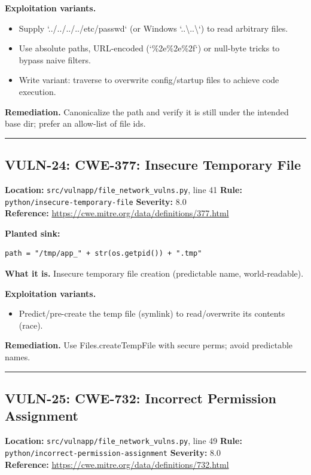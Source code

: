 \documentclass[11pt,a4paper]{article}
\begin{document}
\noindent\textbf{Exploitation variants.}
\begin{itemize}[leftmargin=1.4em,itemsep=1pt,topsep=2pt]
\item Supply `../../../../etc/passwd` (or Windows `..\textbackslash{}..\textbackslash{}`) to read arbitrary files.
\item Use absolute paths, URL-encoded (`\%2e\%2e\%2f`) or null-byte tricks to bypass naive filters.
\item Write variant: traverse to overwrite config/startup files to achieve code execution.
\end{itemize}
\noindent\textbf{Remediation.} Canonicalize the path and verify it is still under the intended base dir; prefer an allow-list of file ids.

\vspace{4pt}\hrule\vspace{6pt}
\subsection{VULN-24: CWE-377: Insecure Temporary File}
\noindent\textbf{Location:} \texttt{src/vulnapp/file\_network\_vulns.py}, line 41 \quad \textbf{Rule:} \texttt{python/insecure-temporary-file} \quad \textbf{Severity:} 8.0
\\ \textbf{Reference:} \url{https://cwe.mitre.org/data/definitions/377.html}

\noindent\textbf{Planted sink:}
\begin{lstlisting}
path = "/tmp/app_" + str(os.getpid()) + ".tmp"
\end{lstlisting}
\noindent\textbf{What it is.} Insecure temporary file creation (predictable name, world-readable).

\noindent\textbf{Exploitation variants.}
\begin{itemize}[leftmargin=1.4em,itemsep=1pt,topsep=2pt]
\item Predict/pre-create the temp file (symlink) to read/overwrite its contents (race).
\end{itemize}
\noindent\textbf{Remediation.} Use Files.createTempFile with secure perms; avoid predictable names.

\vspace{4pt}\hrule\vspace{6pt}
\subsection{VULN-25: CWE-732: Incorrect Permission Assignment}
\noindent\textbf{Location:} \texttt{src/vulnapp/file\_network\_vulns.py}, line 49 \quad \textbf{Rule:} \texttt{python/incorrect-permission-assignment} \quad \textbf{Severity:} 8.0
\\ \textbf{Reference:} \url{https://cwe.mitre.org/data/definitions/732.html}
\end{document}
